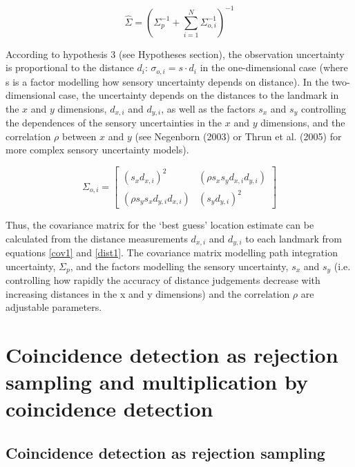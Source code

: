 \begin{equation}\label{cov1}
\hat { \Sigma  } =(\Sigma_p ^{ -1 }+\sum _{ i=1 }^{ N }{ \Sigma _{ o,i }^{ -1 } } )^{ -1 }
\end{equation}

According to hypothesis 3 (see Hypotheses section), the observation uncertainty is proportional to the distance $ d_i $: $ \sigma_{o,i} = s \cdot d_i $ in the one-dimensional case (where s is a factor modelling how sensory uncertainty depends on distance). In the two-dimensional case, the uncertainty depends on the distances to the landmark in the $ x $ and $ y $ dimensions, $ d_{x, i} $ and $ d_{y, i} $, as well as the factors $ s_x $ and $ s_y $ controlling the dependences of the sensory uncertainties in the $ x $ and $ y $ dimensions, and the correlation $ \rho $ between $x$ and $y$ (see Negenborn (2003) or Thrun et al. (2005) for more complex sensory uncertainty models).

\begin{equation}\label{dist1}
\Sigma_{o, i} = \begin{bmatrix} (s_x  d_{x, i})^2  & (\rho s_x  s_y  d_{x, i}  d_{y, i})  \\ (\rho s_y s_x  d_{y, i}  d_{x, i})  & (s_y  d_{y, i})^2  \end{bmatrix}
\end{equation}

Thus, the covariance matrix for the `best guess' location estimate can be calculated from the distance measurements $ d_{x, i} $ and $ d_{y, i} $ to each landmark from equations \eqref{cov1} and \eqref{dist1}. The covariance matrix modelling path integration uncertainty, $ \Sigma_p $, and the factors modelling the sensory uncertainty, $s_x$ and $s_y$ (i.e. controlling how rapidly the accuracy of distance judgements decrease with increasing distances in the x and y dimensions) and the correlation $\rho$ are adjustable parameters.



\section{Coincidence detection as rejection sampling and multiplication by coincidence detection}

\subsection*{Coincidence detection as rejection sampling}

